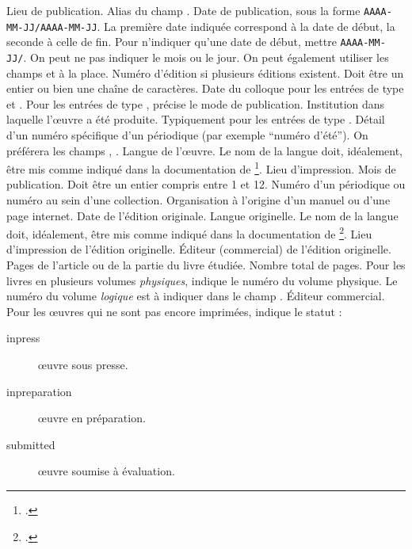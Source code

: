 \begin{fieldlist}
	Lieu de publication. Alias du champ .	
	Date de publication, sous la forme \verb|AAAA-MM-JJ/AAAA-MM-JJ|.
	La première date indiquée correspond à la date de début, la seconde à celle de fin. Pour n'indiquer qu'une date de début, mettre \verb|AAAA-MM-JJ/|. 
	On peut ne pas indiquer le mois ou le jour. On peut également utiliser les champs  et  à la place. 
	Numéro d'édition si plusieurs éditions existent. Doit être un entier ou bien une chaîne de caractères.
   	 Date du colloque pour les entrées de type  et . 
	 Pour les entrées de type , précise le mode de publication.
   	 Institution dans laquelle l'œuvre a été produite. Typiquement pour les entrées de type . 
   	 Détail d'un numéro spécifique d'un périodique (par exemple \enquote{numéro d'été}). On préférera les champs , .	
   	 Langue de l'œuvre. Le nom de la langue doit, idéalement, être mis comme indiqué dans la documentation de \footcite{polyglossia}.					
   	 Lieu d'impression.  					
   	 Mois de publication. Doit être un entier compris entre 1 et 12. 
   	 Numéro d'un périodique ou numéro au sein d'une collection. 	
   	 Organisation à l'origine d'un manuel ou d'une page internet.	
   	 Date de l'édition originale.						
   	 Langue originelle. Le nom de la langue doit, idéalement, être mis comme indiqué dans la documentation de \footcite{polyglossia}. 
   	 Lieu d'impression de l'édition originelle.		
   	 Éditeur (commercial) de l'édition originelle.		
	 Pages de l'article ou de la partie du livre étudiée. 
	 Nombre total de pages.
   	 Pour les livres en plusieurs volumes \emph{physiques}, indique le numéro du volume physique.  Le numéro du volume \emph{logique} est à indiquer dans le champ .
   	 Éditeur commercial.					
   	 Pour les œuvres qui ne sont pas encore imprimées, indique le statut :
					\begin{description}
						\item[inpress]œuvre sous presse.
						\item[inpreparation]œuvre en préparation.
						\item[submitted]œuvre soumise à évaluation.
					\end{description}
					

\end{fieldlist}
